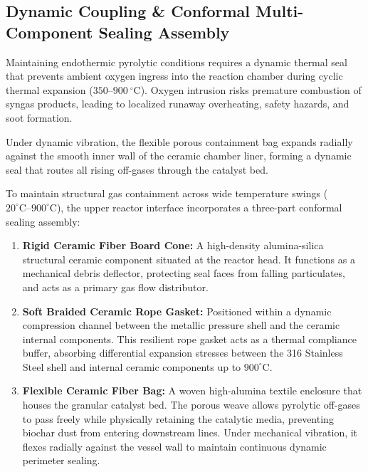 \documentclass[10pt,twocolumn,a4paper]{article}
\begin{document}
\subsection{Dynamic Coupling \& Conformal Multi-Component Sealing Assembly}

Maintaining endothermic pyrolytic conditions requires a dynamic thermal seal that prevents ambient oxygen ingress into the reaction chamber during cyclic thermal expansion ($350\text{--}900~^\circ\text{C}$). Oxygen intrusion risks premature combustion of syngas products, leading to localized runaway overheating, safety hazards, and soot formation.

Under dynamic vibration, the flexible porous containment bag expands radially against the smooth inner wall of the ceramic chamber liner, forming a dynamic seal that routes all rising off-gases through the catalyst bed.

To maintain structural gas containment across wide temperature swings ($20^\circ\text{C}\text{--}900^\circ\text{C}$), the upper reactor interface incorporates a three-part conformal sealing assembly:

\begin{enumerate}[leftmargin=*]
    \item \textbf{Rigid Ceramic Fiber Board Cone:} A high-density alumina-silica structural ceramic component situated at the reactor head. It functions as a mechanical debris deflector, protecting seal faces from falling particulates, and acts as a primary gas flow distributor.
    \item \textbf{Soft Braided Ceramic Rope Gasket:} Positioned within a dynamic compression channel between the metallic pressure shell and the ceramic internal components. This resilient rope gasket acts as a thermal compliance buffer, absorbing differential expansion stresses between the 316 Stainless Steel shell and internal ceramic components up to $900^\circ\text{C}$.
    \item \textbf{Flexible Ceramic Fiber Bag:} A woven high-alumina textile enclosure that houses the granular catalyst bed. The porous weave allows pyrolytic off-gases to pass freely while physically retaining the catalytic media, preventing biochar dust from entering downstream lines. Under mechanical vibration, it flexes radially against the vessel wall to maintain continuous dynamic perimeter sealing.
\end{enumerate}
\end{document}

